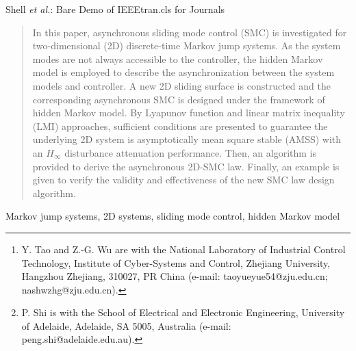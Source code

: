 \documentclass[journal,final,twocolumn]{IEEEtran}
\begin{document}

\author{Yue-Yue Tao, Zheng-Guang Wu, and Peng Shi
	\thanks{Y. Tao and Z.-G. Wu are with the National Laboratory of Industrial Control Technology, Institute of Cyber-Systems and Control, Zhejiang University, Hangzhou Zhejiang, 310027, PR China (e-mail: taoyueyue54@zju.edu.cn; nashwzhg@zju.edu.cn).}
	\thanks{P. Shi is with the School of Electrical and Electronic Engineering, University of Adelaide, Adelaide, SA 5005, Australia (e-mail: peng.shi@adelaide.edu.au). }  
}

%
{Shell \MakeLowercase{\textit{et al.}}: Bare Demo of IEEEtran.cls for Journals}

\maketitle



\begin{abstract}
	In this paper, asynchronous sliding mode control (SMC) is investigated for two-dimensional (2D) discrete-time Markov jump systems. As the system modes are not always accessible to the controller, the hidden Markov model is employed to describe the asynchronization between the system models and controller. A new 2D sliding surface is constructed and the corresponding asynchronous SMC is designed under the framework of hidden Markov model. By Lyapunov function and linear matrix inequality (LMI) approaches, sufficient conditions are presented to guarantee the underlying 2D system is asymptotically mean square stable (AMSS) with an $H_\infty$ disturbance attenuation performance. Then, an algorithm is provided to derive the asynchronous 2D-SMC law. Finally, an example is given to verify the validity and effectiveness of the new SMC law design algorithm.
\end{abstract}


\begin{IEEEkeywords}
	Markov jump systems, 2D systems, sliding mode control, hidden Markov model
\end{IEEEkeywords}
\end{document}
